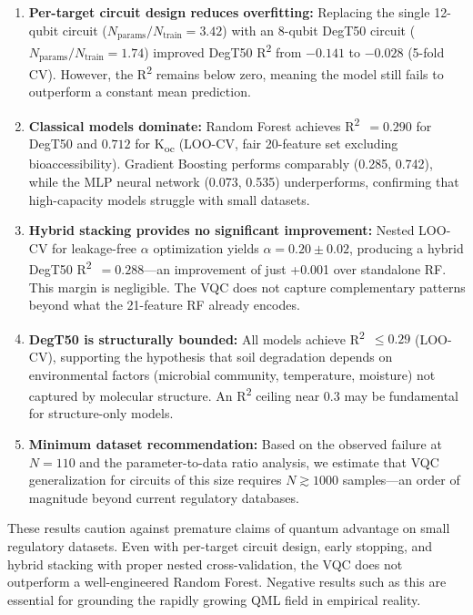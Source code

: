 \documentclass[12pt,a4paper]{article}
\newcommand{\degtl}{DegT50}
\newcommand{\koc}{K\textsubscript{oc}}
\newcommand{\rtwo}{R\textsuperscript{2}}
\newcommand{\loocv}{LOO-CV}
\newcommand{\nsub}{110}
\begin{document}
\begin{enumerate}
  \item \textbf{Per-target circuit design reduces overfitting:} Replacing
        the single 12-qubit circuit ($N_\text{params}/N_\text{train} = 3.42$) with an
        8-qubit \degtl{} circuit ($N_\text{params}/N_\text{train} = 1.74$) improved
        \degtl{} \rtwo{} from $-0.141$ to $-0.028$ (5-fold CV). However,
        the \rtwo{} remains below zero, meaning the model still fails to
        outperform a constant mean prediction.

  \item \textbf{Classical models dominate:} Random Forest achieves
        \rtwo{}~$= 0.290$ for \degtl{} and $0.712$ for \koc{}
        (\loocv{}, fair 20-feature set excluding bioaccessibility).
        Gradient Boosting performs comparably (0.285, 0.742),
        while the MLP neural network (0.073, 0.535) underperforms,
        confirming that high-capacity models struggle with small datasets.

  \item \textbf{Hybrid stacking provides no significant improvement:}
        Nested LOO-CV for leakage-free $\alpha$ optimization yields
        $\alpha = 0.20 \pm 0.02$, producing a hybrid \degtl{}
        \rtwo{}~$= 0.288$---an improvement of just +0.001 over standalone
        RF. This margin is negligible. The VQC does not capture
        complementary patterns beyond what the 21-feature RF already
        encodes.

  \item \textbf{\degtl{} is structurally bounded:} All models achieve
        \rtwo{}~$\leq 0.29$ (\loocv{}), supporting the hypothesis that
        soil degradation depends on environmental factors (microbial
        community, temperature, moisture) not captured by molecular
        structure. An \rtwo{} ceiling near 0.3 may be fundamental for
        structure-only models.

  \item \textbf{Minimum dataset recommendation:} Based on the observed
        failure at $N = \nsub{}$ and the parameter-to-data ratio analysis,
        we estimate that VQC generalization for circuits of this size
        requires $N \gtrsim 1000$ samples---an order of magnitude beyond
        current regulatory databases.
\end{enumerate}

These results caution against premature claims of quantum advantage on
small regulatory datasets. Even with per-target circuit design, early
stopping, and hybrid stacking with proper nested cross-validation, the
VQC does not outperform a well-engineered Random Forest. Negative results
such as this are essential for grounding the rapidly growing QML field
in empirical reality.
\end{document}
